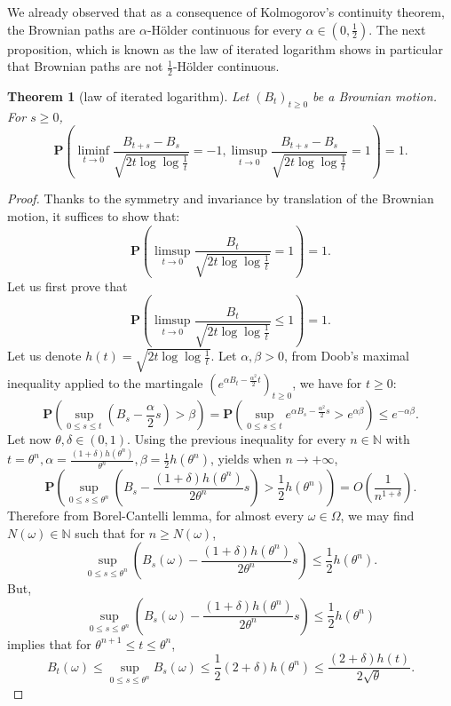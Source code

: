 \documentclass[twoside, 12pt]{book}
\numberwithin{equation}{chapter}
\newtheorem{theorem}{Theorem}[section]
\def\bP{{\mathbf P}}
\def\ge{\geqslant}
\def\le{\leqslant}
\begin{document}
	
	\bigskip
	
	We already observed that as a consequence of Kolmogorov’s continuity theorem, the Brownian paths are $\alpha$-H\"older continuous for every $\alpha \in \left(0,\frac{1}{2}\right)$. The next proposition, which is known as the law of iterated logarithm shows in particular that Brownian paths are not $\frac{1}{2}$-H\"older continuous.
	\begin{theorem}[law of iterated logarithm]
		Let $(B_t)_{t\ge 0}$ be a Brownian motion. For $s \ge 0$,
		\[
		\bP \left( \liminf_{t \rightarrow 0} \frac{B_{t+s}-B_s}{\sqrt{2t \log  \log  \frac{1}{t}}} =-1 , \limsup_{t \rightarrow 0} \frac{B_{t+s}-B_s}{\sqrt{2t\log  \log  \frac{1}{t}}} =1 \right)=1.  
		\]
	\end{theorem}
	\begin{proof}
		Thanks to the symmetry and invariance by translation of the Brownian motion, it suffices to show that:
		$$
		\bP \left( \limsup_{t \rightarrow 0} \frac{B_{t}}{\sqrt{2t\log  \log  \frac{1}{t}}} =1 \right)=1.  
		$$
		Let us first prove that 
		$$
		\bP \left( \limsup_{t \rightarrow 0} \frac{B_{t}}{\sqrt{2t \log  \log  \frac{1}{t}}} \le 1 \right)=1.  
		$$
		Let us denote $h(t)=\sqrt{2t \log  \log  \frac{1}{t}}$.   Let $\alpha, \beta >0$, from Doob’s maximal inequality applied to the martingale $\left(e^{\alpha B_t-\frac{\alpha^2}{2}t} \right)_{t \ge 0}$, we have for $t \ge 0$:
		\[
		\bP  \left(  \sup_{0 \le s \le t} \left( B_s-\frac{\alpha}{2}s\right)>\beta \right)=\bP  \left(  \sup_{0 \le s \le t} e^{\alpha B_s -\frac{\alpha^2}{2}s} >e^{\alpha \beta}\right) \le e^{-\alpha \beta}.
		\]
		Let now $\theta , \delta \in (0,1)$. Using the previous inequality for every $n \in \mathbb{N}$ with $t=\theta^n, \alpha=\frac{(1+\delta)h(\theta^n)}{\theta^n}, \beta=\frac{1}{2} h (\theta^n)$,  yields when $n \rightarrow +\infty$,
		$$
		\bP  \left(  \sup_{0 \le s \le \theta^n} \left( B_s -\frac{(1+\delta)h(\theta^n)}{2\theta^n}s\right)>\frac{1}{2} h (\theta^n) \right)=O\left( \frac{1}{n^{1+\delta}} \right).  
		$$
		Therefore from Borel-Cantelli lemma, for almost every $\omega \in \Omega$, we may find $N(\omega)\in \mathbb{N}$ such that for $n \ge N(\omega)$,
		$$
		\sup_{0 \le s \le \theta^n} \left( B_s(\omega)-\frac{(1+\delta)h(\theta^n)}{2\theta^n} s\right) \le \frac{1}{2}h (\theta^n).  
		$$
		But,
		$$
		\sup_{0 \le s \le \theta^n} \left( B_s(\omega) -\frac{(1+\delta)h(\theta^n)}{2\theta^n} s\right) \le \frac{1}{2} h (\theta^n)  
		$$
		implies that for $\theta^{n+1} \le t\le \theta^n$,
		$$
		B_t (\omega) \le \sup_{0 \le s \le \theta^n} B_s(\omega) \le \frac{1}{2} (2+\delta)h (\theta^n) \le \frac{(2+\delta)h(t)}{2\sqrt{\theta}}.  
$$
\end{proof}
\end{document}
